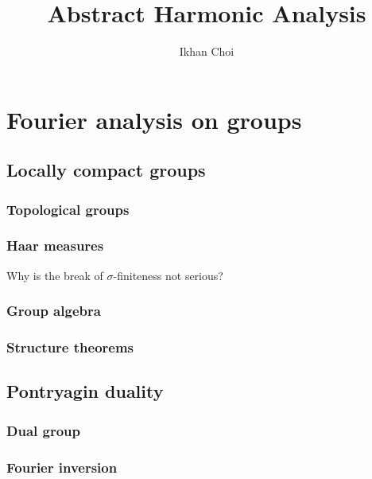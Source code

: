\documentclass{../note}
\begin{document}
\title{Abstract Harmonic Analysis}
\author{Ikhan Choi}
\maketitle
\tableofcontents



\part{Fourier analysis on groups}
\chapter{Locally compact groups}
\section{Topological groups}
\section{Haar measures}
\begin{prb}
\end{prb}
Why is the break of $\sigma$-finiteness not serious?
\section{Group algebra}
\begin{prb}
\end{prb}
\begin{prb}[Convolution]
\end{prb}
\section{Structure theorems}


\chapter{Pontryagin duality}
\section{Dual group}
\section{Fourier inversion}
\begin{prb}
\end{prb}
\begin{prb}
\end{prb}
\begin{prb}
\end{prb}
\begin{prb}
\end{prb}
\end{document}
